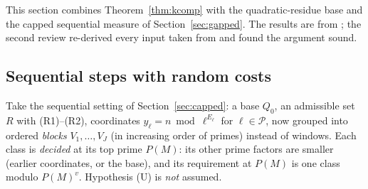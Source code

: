 \documentclass[10pt,reqno]{amsart}
\theoremstyle{definition}
\theoremstyle{remark}
\newcommand{\cP}{\mathcal P}
\begin{document}
This section combines Theorem~\ref{thm:kcomp} with the quadratic-residue
base and the capped sequential measure of Section~\ref{sec:gapped}.  The
results are from \cite[\S4]{KA}; the second review \cite{KArev2}
re-derived every input taken from \cite{TW} and found the argument sound.

\subsection{Sequential steps with random costs}
Take the sequential setting of Section~\ref{sec:capped}: a base $Q_0$, an
admissible set $R$ with (R1)--(R2), coordinates $y_\ell=n\bmod\ell^{E_\ell}$
for $\ell\in\cP$, now grouped into ordered \emph{blocks} $V_1,\dots,V_J$ (in
increasing order of primes) instead of windows.  Each class is
\emph{decided} at its top prime $P(M)$: its other prime factors are smaller
(earlier coordinates, or the base), and its requirement at $P(M)$ is one
class modulo $P(M)^v$.  Hypothesis (U) is \emph{not} assumed.
\end{document}
